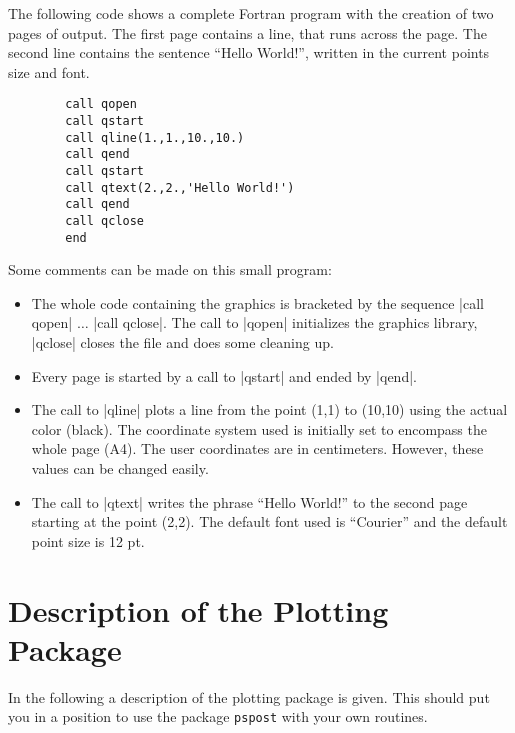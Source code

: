 \documentclass{article}
\newcommand{\psp}{{\tt pspost}}
\begin{document}
\label{Example}

The following code shows a complete Fortran program
with the creation of two pages of output. The first
page contains a line, that runs across the page. The second line
contains the sentence ``Hello World!'', written in the current points
size and font.

\begin{verbatim}
        call qopen
        call qstart
        call qline(1.,1.,10.,10.)
        call qend
        call qstart
        call qtext(2.,2.,'Hello World!')
        call qend
        call qclose
        end
\end{verbatim}

Some comments can be made on this small program:
\begin{itemize}

\item   The whole code containing the graphics is bracketed by the
        sequence |call qopen| $\ldots$ |call qclose|. The call to
        |qopen| initializes the graphics library, |qclose| closes the
        file and does some cleaning up.

\item   Every page is started by a call to |qstart| and ended
        by |qend|.

\item   The call to |qline| plots a line from the point
        (1,1) to (10,10) using the actual color (black).  The
        coordinate system used is initially set to encompass the whole
        page (A4). The user coordinates are in centimeters. However,
        these values can be changed easily.

\item   The call to |qtext| writes the phrase
        ``Hello World!'' to the second page starting at the point
        (2,2). The default font used is ``Courier'' and the default
        point size is 12 pt.

\end{itemize}


\section{Description of the Plotting Package}

\label{Descrip}

In the following a description of the plotting package is given.  This
should put you in a position to use the package \psp{} with your own
routines.
\end{document}
